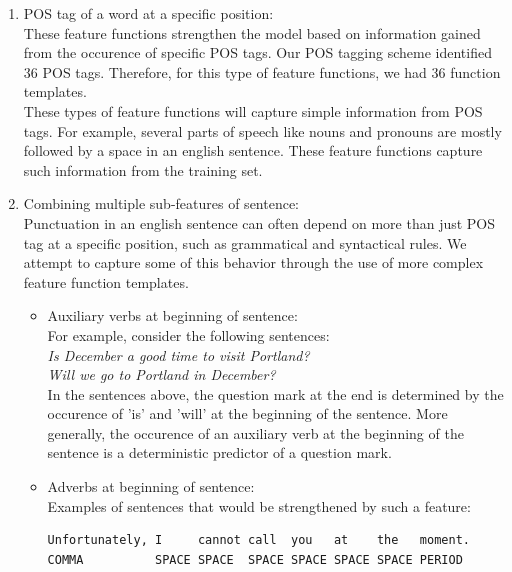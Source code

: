 \documentclass[11pt,a4paper,oneside]{article}
\begin{document}
\begin{enumerate}
\item{POS tag of a word at a specific position:} \\

These feature functions strengthen the model based on information gained from the occurence of specific POS tags. Our POS tagging scheme identified 36 POS tags. Therefore, for this type of feature functions, we had 36 function templates.\\

These types of feature functions will capture simple information from POS tags. 
For example, several parts of speech like nouns and pronouns are mostly followed by a space in an english sentence. These feature functions capture such information from the training set.

\item{Combining multiple sub-features of sentence:}\\

Punctuation in an english sentence can often depend on more than just POS tag at a specific position, such as grammatical and syntactical rules. We attempt to capture some of this behavior through the use of more complex feature function templates.

\begin{itemize}
\item{Auxiliary verbs at beginning of sentence:}\\

For example, consider the following sentences:\\

\textit{Is December a good time to visit Portland?}
\\\textit{Will we go to Portland in December?}\\

In the sentences above, the question mark at the end is determined by the occurence of 'is' and 'will' at the beginning of the sentence. More generally, the occurence of an auxiliary verb \cite{auxverbs} at the beginning of the sentence is a deterministic predictor of a question mark.\\

\item{Adverbs at beginning of sentence:}\\

Examples of sentences that would be strengthened by such a feature:

\begin{verbatim}
Unfortunately, I     cannot call  you   at    the   moment.
COMMA          SPACE SPACE  SPACE SPACE SPACE SPACE PERIOD
\end{verbatim}


\end{itemize}
\end{enumerate}
\end{document}
